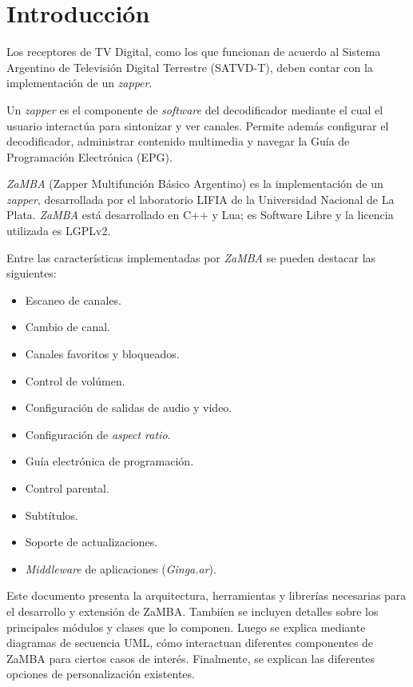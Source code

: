 \setlength{\parskip}{5mm}
\setlength{\parindent}{5mm}

\linespread{1.1}%
\selectfont	

\section{Introducción}

Los receptores de TV Digital, como los que funcionan de acuerdo al 
Sistema Argentino de Televisión Digital Terrestre (SATVD-T), deben contar con 
la  implementación de un \textit{zapper}.

Un \textit{zapper} es el componente de \textit{software} del decodificador mediante el
cual el usuario interactúa para sintonizar y ver canales. 
Permite además configurar el decodificador, administrar contenido multimedia 
y navegar la Guía de Programación Electrónica (EPG).

\emph{ZaMBA} (Zapper Multifunción Básico Argentino) es la implementación de
un \textit{zapper}, desarrollada por el laboratorio
LIFIA de la Universidad Nacional de La Plata. \emph{ZaMBA} está 
desarrollado en C++ y Lua; es Software Libre y la licencia utilizada es LGPLv2.

Entre las características implementadas por \textit{ZaMBA} se pueden destacar las siguientes:
\begin{itemize}
\item Escaneo de canales.
\item Cambio de canal.
\item Canales  favoritos y bloqueados.
\item Control de volúmen.
\item Configuración de salidas de audio y video.
\item Configuración de \textit{aspect ratio}.
\item Guía electrónica de programación.
\item Control parental.
\item Subtítulos.
\item Soporte de actualizaciones.
\item \textit{Middleware} de aplicaciones (\textit{Ginga.ar}).
\end{itemize}


Este documento presenta la arquitectura, herramientas y librerías necesarias para el desarrollo y extensión de ZaMBA.
Tambiíen se incluyen detalles sobre los principales módulos y clases que lo componen.
Luego se explica mediante diagramas de secuencia UML, cómo interactuan diferentes componentes de ZaMBA para ciertos casos de interés.
Finalmente, se explican las diferentes opciones de personalización existentes.


